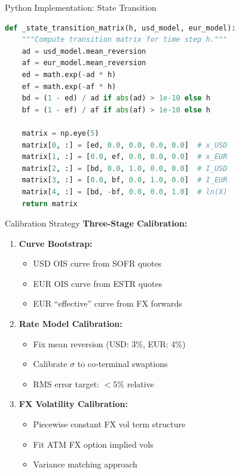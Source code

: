 \documentclass[aspectratio=169,11pt]{beamer}
\begin{document}
\begin{frame}[fragile]{Python Implementation: State Transition}
\begin{lstlisting}[language=Python]
def _state_transition_matrix(h, usd_model, eur_model):
    """Compute transition matrix for time step h."""
    ad = usd_model.mean_reversion
    af = eur_model.mean_reversion
    ed = math.exp(-ad * h)
    ef = math.exp(-af * h)
    bd = (1 - ed) / ad if abs(ad) > 1e-10 else h
    bf = (1 - ef) / af if abs(af) > 1e-10 else h

    matrix = np.eye(5)
    matrix[0, :] = [ed, 0.0, 0.0, 0.0, 0.0]  # x_USD
    matrix[1, :] = [0.0, ef, 0.0, 0.0, 0.0]  # x_EUR
    matrix[2, :] = [bd, 0.0, 1.0, 0.0, 0.0]  # I_USD
    matrix[3, :] = [0.0, bf, 0.0, 1.0, 0.0]  # I_EUR
    matrix[4, :] = [bd, -bf, 0.0, 0.0, 1.0]  # ln(X)
    return matrix
\end{lstlisting}
\end{frame}

\begin{frame}{Calibration Strategy}
\textbf{Three-Stage Calibration:}

\begin{enumerate}
    \item \textbf{Curve Bootstrap:}
    \begin{itemize}
        \item USD OIS curve from SOFR quotes
        \item EUR OIS curve from ESTR quotes
        \item EUR ``effective'' curve from FX forwards
    \end{itemize}

    \item \textbf{Rate Model Calibration:}
    \begin{itemize}
        \item Fix mean reversion (USD: 3\%, EUR: 4\%)
        \item Calibrate $\sigma$ to co-terminal swaptions
        \item RMS error target: $<5\%$ relative
    \end{itemize}

    \item \textbf{FX Volatility Calibration:}
    \begin{itemize}
        \item Piecewise constant FX vol term structure
        \item Fit ATM FX option implied vols
        \item Variance matching approach
    \end{itemize}
\end{enumerate}
\end{frame}
\end{document}
